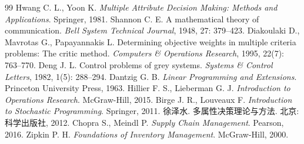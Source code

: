 \documentclass[12pt,a4paper]{ctexart}
\begin{document}
\begin{thebibliography}{99}
 Hwang C. L., Yoon K. \emph{Multiple Attribute Decision Making: Methods and Applications}. Springer, 1981.
 Shannon C. E. A mathematical theory of communication. \emph{Bell System Technical Journal}, 1948, 27: 379--423.
 Diakoulaki D., Mavrotas G., Papayannakis L. Determining objective weights in multiple criteria problems: The critic method. \emph{Computers \& Operations Research}, 1995, 22(7): 763--770.
 Deng J. L. Control problems of grey systems. \emph{Systems \& Control Letters}, 1982, 1(5): 288--294.
 Dantzig G. B. \emph{Linear Programming and Extensions}. Princeton University Press, 1963.
 Hillier F. S., Lieberman G. J. \emph{Introduction to Operations Research}. McGraw-Hill, 2015.
 Birge J. R., Louveaux F. \emph{Introduction to Stochastic Programming}. Springer, 2011.
 徐泽水. 多属性决策理论与方法. 北京: 科学出版社, 2012.
 Chopra S., Meindl P. \emph{Supply Chain Management}. Pearson, 2016.
 Zipkin P. H. \emph{Foundations of Inventory Management}. McGraw-Hill, 2000.
\end{thebibliography}

\appendix
\end{document}
